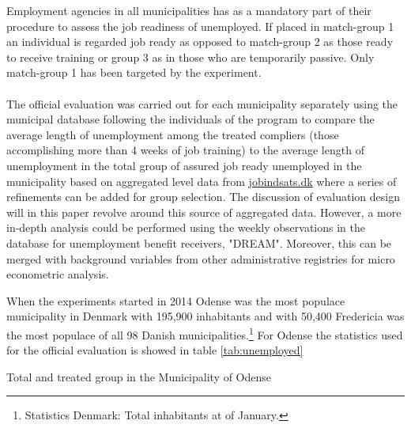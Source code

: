 Employment agencies in all municipalities has as a mandatory part of their procedure to assess the job readiness of unemployed. If placed in match-group 1 an individual is regarded job ready as opposed to match-group 2 as those ready to receive training or group 3 as in those who are temporarily passive. Only match-group 1 has been targeted by the experiment.
\\
\\
The official evaluation was carried out for each municipality separately using the municipal database following the individuals of the program to compare the average length of unemployment among the treated compliers (those accomplishing more than 4 weeks of job training) to the average length of unemployment in the total group of assured job ready unemployed in the municipality based on aggregated level data from \url{jobindsats.dk} where a series of refinements can be added for group selection. The discussion of evaluation design will in this paper revolve around this source of aggregated data. However, a more in-depth analysis could be performed using the weekly observations in the database for unemployment benefit receivers, "DREAM". Moreover, this can be merged with background variables from other administrative registries for micro econometric analysis.

When the experiments started in 2014 Odense was the  most populace municipality in Denmark with 195,900 inhabitants and with 50,400 Fredericia was the  most populace of all 98 Danish municipalities.\footnote{Statistics Denmark: Total inhabitants at  of January.} For Odense the statistics used for the official evaluation is showed in table \ref{tab:unemployed}
\begin{table}[H]
  \centering
  \caption{Total and treated group in the Municipality of Odense}
  \footnotesize
    
  \label{tab:unemployed}
\end{table}
